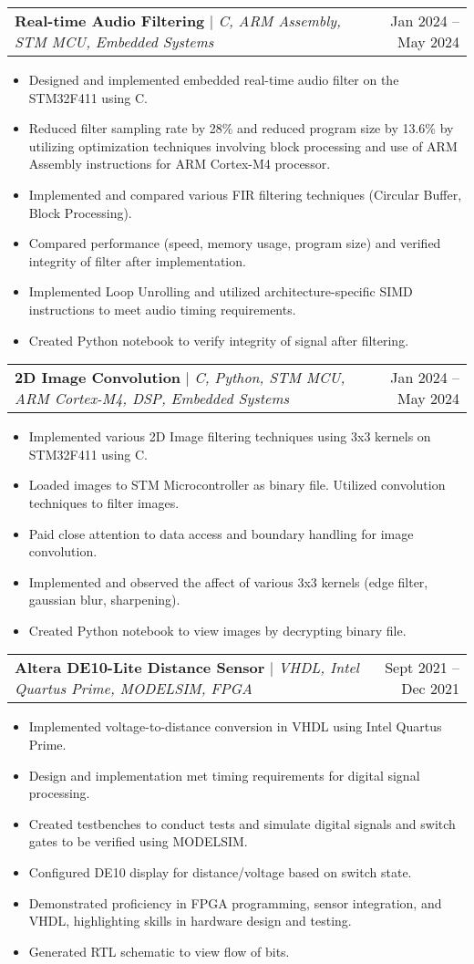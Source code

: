 \documentclass[A4,10pt]{article}
\makeatletter
\newcommand{\resumeItem}[1]{
  \item\small{
    {#1 \vspace{-2pt}}
  }
}
\newcommand{\resumeProjectHeading}[2]{
    \item
    \begin{tabular*}{0.97\textwidth}{l@{\extracolsep{\fill}}r}
      \small#1 & #2 \\
    \end{tabular*}\vspace{-7pt}
}
\newcommand{\resumeItemListStart}{\begin{itemize}}
\newcommand{\resumeItemListEnd}{\end{itemize}\vspace{-5pt}}
\makeatother
\begin{document}
        \resumeProjectHeading
        {\textbf{Real-time Audio Filtering} $|$ \emph{C, ARM Assembly, STM MCU, Embedded Systems}}{Jan 2024 -- May 2024}
        \resumeItemListStart
          \resumeItem{Designed and implemented embedded real-time audio filter on the STM32F411 using C.}
          \resumeItem{Reduced filter sampling rate by 28\% and reduced program size by 13.6\% by utilizing optimization techniques involving block processing and use of ARM Assembly instructions for ARM Cortex-M4 processor.}
          \resumeItem{Implemented and compared various FIR filtering techniques (Circular Buffer, Block Processing).}
          \resumeItem{Compared performance (speed, memory usage, program size) and verified integrity of filter after implementation.}
          \resumeItem{Implemented Loop Unrolling and utilized architecture-specific SIMD instructions to meet audio timing requirements.}
          \resumeItem{Created Python notebook to verify integrity of signal after filtering.}
        \resumeItemListEnd
        
        \resumeProjectHeading
        {\textbf{2D Image Convolution} $|$ \emph{C, Python, STM MCU, ARM Cortex-M4, DSP, Embedded Systems}}{Jan 2024 -- May 2024}
        \resumeItemListStart
          \resumeItem{Implemented various 2D Image filtering techniques using 3x3 kernels on STM32F411 using C.}
          \resumeItem{Loaded images to STM Microcontroller as binary file. Utilized convolution techniques to filter images.}
          \resumeItem{Paid close attention to data access and boundary handling for image convolution.}
          \resumeItem{Implemented and observed the affect of various 3x3 kernels (edge filter, gaussian blur, sharpening).}
          \resumeItem{Created Python notebook to view images by decrypting binary file.}
        \resumeItemListEnd

        \resumeProjectHeading
        {\textbf{Altera DE10-Lite Distance Sensor} $|$ \emph{VHDL, Intel Quartus Prime, MODELSIM, FPGA}}{Sept 2021 -- Dec 2021}
        \resumeItemListStart
          \resumeItem{Implemented voltage-to-distance conversion in VHDL using Intel Quartus Prime.}
          \resumeItem{Design and implementation met timing requirements for digital signal processing.}
          \resumeItem{Created testbenches to conduct tests and simulate digital signals and switch gates to be verified using MODELSIM.}
          \resumeItem{Configured DE10 display for distance/voltage based on switch state.}
          \resumeItem{Demonstrated proficiency in FPGA programming, sensor integration, and VHDL, highlighting skills in hardware design and testing.}
          \resumeItem{Generated RTL schematic to view flow of bits.}
        \resumeItemListEnd
  
\end{document}
